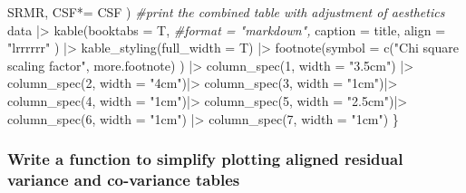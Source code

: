 \documentclass[
]{article}
\newenvironment{Shaded}{\begin{snugshade}}{\end{snugshade}}
\newcommand{\AttributeTok}[1]{\textcolor[rgb]{0.77,0.63,0.00}{#1}}
\newcommand{\CommentTok}[1]{\textcolor[rgb]{0.56,0.35,0.01}{\textit{#1}}}
\newcommand{\DecValTok}[1]{\textcolor[rgb]{0.00,0.00,0.81}{#1}}
\newcommand{\FunctionTok}[1]{\textcolor[rgb]{0.00,0.00,0.00}{#1}}
\newcommand{\NormalTok}[1]{#1}
\newcommand{\OtherTok}[1]{\textcolor[rgb]{0.56,0.35,0.01}{#1}}
\newcommand{\SpecialCharTok}[1]{\textcolor[rgb]{0.00,0.00,0.00}{#1}}
\newcommand{\StringTok}[1]{\textcolor[rgb]{0.31,0.60,0.02}{#1}}
\begin{document}
\begin{Shaded}
\begin{Highlighting}[]
\NormalTok{    SRMR, }
    \StringTok{\textquotesingle{}CSF*\textquotesingle{}}\OtherTok{=}\NormalTok{ CSF}
\NormalTok{    ) }
\CommentTok{\#print the combined table with adjustment of aesthetics}
\NormalTok{data }\SpecialCharTok{|\textgreater{}} 
  \FunctionTok{kable}\NormalTok{(}\AttributeTok{booktabs =}\NormalTok{ T, }
        \CommentTok{\#format = "markdown", }
        \AttributeTok{caption =} 
\NormalTok{          title,}
        \AttributeTok{align =} \StringTok{"lrrrrrr"}
\NormalTok{        ) }\SpecialCharTok{|\textgreater{}} 
  \FunctionTok{kable\_styling}\NormalTok{(}\AttributeTok{full\_width =}\NormalTok{ T) }\SpecialCharTok{|\textgreater{}} 
  \FunctionTok{footnote}\NormalTok{(}\AttributeTok{symbol =} 
             \FunctionTok{c}\NormalTok{(}\StringTok{"Chi square scaling factor"}\NormalTok{, }
\NormalTok{               more.footnote)}
\NormalTok{           ) }\SpecialCharTok{|\textgreater{}}
  \FunctionTok{column\_spec}\NormalTok{(}\DecValTok{1}\NormalTok{, }\AttributeTok{width =} \StringTok{"3.5cm"}\NormalTok{) }\SpecialCharTok{|\textgreater{}} 
  \FunctionTok{column\_spec}\NormalTok{(}\DecValTok{2}\NormalTok{, }\AttributeTok{width =} \StringTok{"4cm"}\NormalTok{)}\SpecialCharTok{|\textgreater{}} 
  \FunctionTok{column\_spec}\NormalTok{(}\DecValTok{3}\NormalTok{, }\AttributeTok{width =} \StringTok{"1cm"}\NormalTok{)}\SpecialCharTok{|\textgreater{}} 
  \FunctionTok{column\_spec}\NormalTok{(}\DecValTok{4}\NormalTok{, }\AttributeTok{width =} \StringTok{"1cm"}\NormalTok{)}\SpecialCharTok{|\textgreater{}} 
  \FunctionTok{column\_spec}\NormalTok{(}\DecValTok{5}\NormalTok{, }\AttributeTok{width =} \StringTok{"2.5cm"}\NormalTok{)}\SpecialCharTok{|\textgreater{}} 
  \FunctionTok{column\_spec}\NormalTok{(}\DecValTok{6}\NormalTok{, }\AttributeTok{width =} \StringTok{"1cm"}\NormalTok{) }\SpecialCharTok{|\textgreater{}} 
  \FunctionTok{column\_spec}\NormalTok{(}\DecValTok{7}\NormalTok{, }\AttributeTok{width =} \StringTok{"1cm"}\NormalTok{) }
\NormalTok{\}}
\end{Highlighting}
\end{Shaded}

\hypertarget{write-a-function-to-simplify-plotting-aligned-residual-variance-and-co-variance-tables}{%
\subsubsection{Write a function to simplify plotting aligned residual variance and co-variance tables}\label{write-a-function-to-simplify-plotting-aligned-residual-variance-and-co-variance-tables}}
\end{document}

